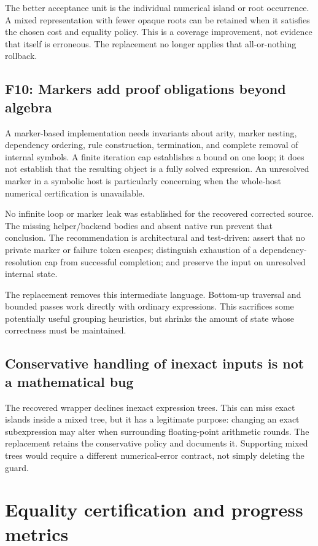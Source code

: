 \documentclass[11pt,letterpaper]{article}
\numberwithin{equation}{section}
\theoremstyle{definition}\newtheorem{definition}[theorem]{Definition}
\theoremstyle{remark}\newtheorem{remark}[theorem]{Remark}
\newcommand{\code}[1]{\texttt{\detokenize{#1}}}
\newcommand{\finding}[2]{\subsection{#1: #2}}
\begin{document}
The better acceptance unit is the individual numerical island or root occurrence. A mixed representation with fewer opaque roots can be retained when it satisfies the chosen cost and equality policy. This is a coverage improvement, not evidence that \code{ToRadicals} itself is erroneous. The replacement no longer applies that all-or-nothing rollback.

\finding{F10}{Markers add proof obligations beyond algebra}
A marker-based implementation needs invariants about arity, marker nesting, dependency ordering, rule construction, termination, and complete removal of internal symbols. A finite iteration cap establishes a bound on one loop; it does not establish that the resulting object is a fully solved expression. An unresolved marker in a symbolic host is particularly concerning when the whole-host numerical certification is unavailable.

No infinite loop or marker leak was established for the recovered corrected source. The missing helper/backend bodies and absent native run prevent that conclusion. The recommendation is architectural and test-driven: assert that no private marker or failure token escapes; distinguish exhaustion of a dependency-resolution cap from successful completion; and preserve the input on unresolved internal state.

The replacement removes this intermediate language. Bottom-up traversal and bounded passes work directly with ordinary expressions. This sacrifices some potentially useful grouping heuristics, but shrinks the amount of state whose correctness must be maintained.

\subsection{Conservative handling of inexact inputs is not a mathematical bug}
The recovered wrapper declines inexact expression trees. This can miss exact islands inside a mixed tree, but it has a legitimate purpose: changing an exact subexpression may alter when surrounding floating-point arithmetic rounds. The replacement retains the conservative policy and documents it. Supporting mixed trees would require a different numerical-error contract, not simply deleting the guard.

\section{Equality certification and progress metrics}
\label{sec:certification}
\end{document}
